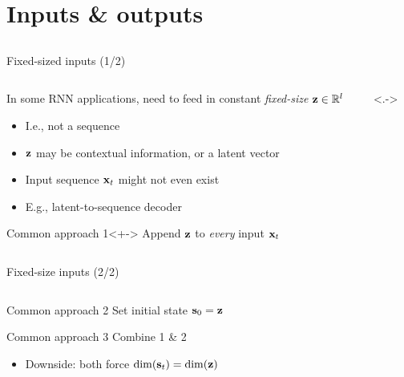 \section{Inputs \& outputs}
\subsection{}

\begin{frame}{Fixed-sized inputs (1/2)}
    \begin{columns}
        \begin{column}{0.816\textwidth}
            \begin{block}{}
                In some RNN applications, need to feed in constant \emph{fixed-size} $\mathbf{z} \in \mathbb{R}^l$
            \end{block}

            \begin{itemize}
                \item<+-> I.e., not a sequence
                \item $\mathbf{z}$ may be contextual information, or a latent vector
                \item Input sequence $\mathbf{x}_t$ might not even exist
                \item E.g., latent-to-sequence decoder
            \end{itemize}

            \begin{block}{Common approach 1}<+->
                Append \textcolor{Green4}{$\mathbf{z}$} to \emph{every} input $\mathbf{x}_t$
            \end{block}
        \end{column}
        \begin{column}{0.184\textwidth}
            \uncover<.->{}
        \end{column}
    \end{columns}
\end{frame}

\begin{frame}{Fixed-size inputs (2/2)}
    \begin{columns}
        \begin{column}{0.4\textwidth}
            \begin{block}{Common approach 2}
                Set initial state \textcolor{Green4}{$\mathbf{s}_0 = \mathbf{z}$}
            \end{block}
            \begin{block}{Common approach 3}
                Combine 1 \& 2
            \end{block}
            \begin{itemize}
                \item Downside: both force $\dim(\mathbf{s}_t) = \dim(\mathbf{z})$
            \end{itemize}
        \end{column}
        \begin{column}{0.6\textwidth}
            
        \end{column}
    \end{columns}
\end{frame}

